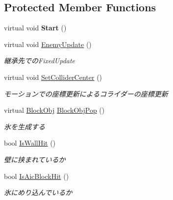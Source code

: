 \subsection*{Protected Member Functions}
\begin{DoxyCompactItemize}
\item 
\mbox{\label{class_enemy_a0c283968cd63b30131665abda46d933e}} 
virtual void {\bfseries Start} ()
\item 
virtual void \hyperlink{class_enemy_ab19a73003a5b443ba93f4b6a45c0abad}{Enemy\+Update} ()
\begin{DoxyCompactList}\small\item\em 継承先での\+Fixed\+Update \end{DoxyCompactList}\item 
virtual void \hyperlink{class_enemy_a050e257a9a9f3b1b01923be24eaa7577}{Set\+Collider\+Center} ()
\begin{DoxyCompactList}\small\item\em モーションでの座標更新によるコライダーの座標更新 \end{DoxyCompactList}\item 
virtual \hyperlink{class_block_obj}{Block\+Obj} \hyperlink{class_enemy_ab56d4c134b6fc007e07e6825b04f11a5}{Block\+Obj\+Pop} ()
\begin{DoxyCompactList}\small\item\em 氷を生成する \end{DoxyCompactList}\item 
bool \hyperlink{class_enemy_a058914a6e2dd7d3d898c2b8bfcc7fa70}{Is\+Wall\+Hit} ()
\begin{DoxyCompactList}\small\item\em 壁に挟まれているか \end{DoxyCompactList}\item 
bool \hyperlink{class_enemy_a16617ee5a2f6bf7d5ae879dd9ca2d230}{Is\+Aic\+Block\+Hit} ()
\begin{DoxyCompactList}\small\item\em 氷にめり込んでいるか \end{DoxyCompactList}\end{DoxyCompactItemize}
